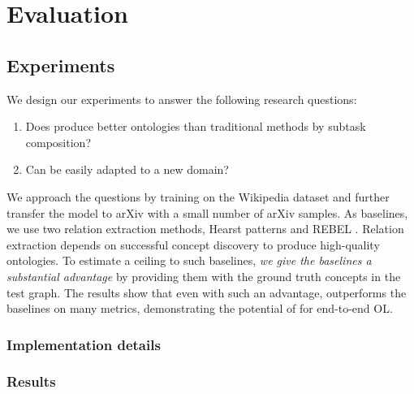 \chapter{Evaluation}

\section{Experiments}

We design our experiments to answer the following research questions:
\begin{enumerate}
    \item Does \name produce better ontologies than traditional methods by subtask composition?
    \item Can \name be easily adapted to a new domain?
\end{enumerate}
We approach the questions by training \name on the Wikipedia dataset and further transfer the model to arXiv with a small number of arXiv samples. As baselines, we use two relation extraction methods, Hearst patterns \cite{hearst1998automated,roller2018hearst} and REBEL \cite{cabot2021rebel}. Relation extraction depends on successful concept discovery to produce high-quality ontologies. To estimate a ceiling to such baselines, \emph{we give the baselines a substantial advantage} by providing them with the ground truth concepts in the test graph. The results show that even with such an advantage, \name outperforms the baselines on many metrics, demonstrating the potential of \name for end-to-end OL.

\subsection{Implementation details}  \label{sec:implementation}



\subsection{Results}  \label{sec:results}



